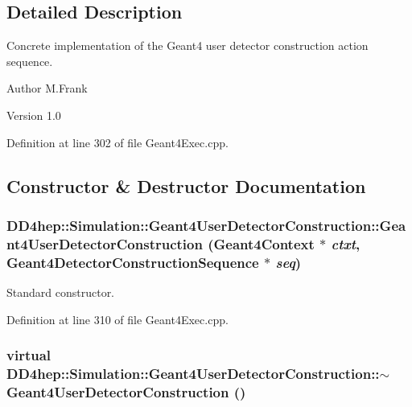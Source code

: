 \subsection{Detailed Description}
Concrete implementation of the Geant4 user detector construction action sequence. \begin{DoxyAuthor}{Author}
M.Frank 
\end{DoxyAuthor}
\begin{DoxyVersion}{Version}
1.0 
\end{DoxyVersion}


Definition at line 302 of file Geant4Exec.cpp.

\subsection{Constructor \& Destructor Documentation}
\hypertarget{class_d_d4hep_1_1_simulation_1_1_geant4_user_detector_construction_af1e3e857893be886738096501d5932f7}{
\subsubsection[{Geant4UserDetectorConstruction}]{\setlength{\rightskip}{0pt plus 5cm}DD4hep::Simulation::Geant4UserDetectorConstruction::Geant4UserDetectorConstruction ({\bf Geant4Context} $\ast$ {\em ctxt}, \/  {\bf Geant4DetectorConstructionSequence} $\ast$ {\em seq})}}
\label{class_d_d4hep_1_1_simulation_1_1_geant4_user_detector_construction_af1e3e857893be886738096501d5932f7}


Standard constructor. 

Definition at line 310 of file Geant4Exec.cpp.\hypertarget{class_d_d4hep_1_1_simulation_1_1_geant4_user_detector_construction_a076334cddb22f1ca55027d6bc3a1aac9}{
\subsubsection[{$\sim$Geant4UserDetectorConstruction}]{\setlength{\rightskip}{0pt plus 5cm}virtual DD4hep::Simulation::Geant4UserDetectorConstruction::$\sim$Geant4UserDetectorConstruction ()}}
\label{class_d_d4hep_1_1_simulation_1_1_geant4_user_detector_construction_a076334cddb22f1ca55027d6bc3a1aac9}


